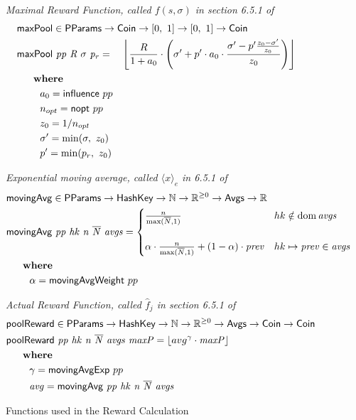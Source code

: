 \begin{figure}[htb]
  \emph{Maximal Reward Function, called $f(s,\sigma)$ in section 6.5.1 of \cite{delegation_design}}
  \begin{align*}
      & \fun{maxPool} \in \PParams \to \Coin \to \unitInterval \to \unitInterval \to \Coin \\
      & \fun{maxPool}~\var{pp}~\var{R}~\sigma~\var{p_r} =
          ~~~\floor*{
             \frac{R}{1 + a_0}
             \cdot
             \left(
               \sigma' + p'\cdot a_0\cdot\frac{\sigma' - p'\frac{z_0-\sigma'}{z_0}}{z_0}
             \right)} \\
      & ~~~\where \\
      & ~~~~~~~a_0 = \fun{influence}~pp \\
      & ~~~~~~~n_{opt} = \fun{nopt}~pp \\
      & ~~~~~~~z_0 = 1/n_{opt} \\
      & ~~~~~~~\sigma'=\min(\sigma,~z_0) \\
      & ~~~~~~~p'=\min(p_r,~z_0) \\
  \end{align*}

  \emph{Exponential moving average, called $\langle x\rangle_e$ in 6.5.1 of
        \cite{delegation_design}}
  \begin{align*}
      & \fun{movingAvg} \in \PParams \to \HashKey \to \N \to \Rnn \to \Avgs \to \R \\
      & \movingAvg{pp}{hk}{n}{\overline{N}}{avgs} =
        \begin{cases}
        \frac{n}{\max(\overline{N}, 1)}
        & hk\notin \dom\var{avgs}\\
        \\
          \alpha\cdot\frac{n}{\max(\overline{N}, 1)}+(1-\alpha)\cdot\var{prev}
        & hk\mapsto\var{prev}\in\var{avgs}\\
        \end{cases} \\
      & ~~~\where \\
      & ~~~~~~~\alpha = \fun{movingAvgWeight}~pp \\
  \end{align*}

  \emph{Actual Reward Function, called $\hat{f}_j$ in section 6.5.1 of \cite{delegation_design}}
  \begin{align*}
      & \fun{poolReward} \in \PParams \to \HashKey \to \N \to \Rnn \to \Avgs \to \Coin \to \Coin \\
      & \poolReward{pp}{hk}{n}{\overline{N}}{avgs}{maxP} =
      \floor*{avg^\gamma\cdot \var{maxP}}\\
      & ~~~\where \\
      & ~~~~~~~\gamma = \fun{movingAvgExp}~pp \\
      & ~~~~~~~\var{avg} = \movingAvg{pp}{hk}{n}{\overline{N}}{avgs} \\
  \end{align*}
  \caption{Functions used in the Reward Calculation}
  \label{fig:functions:rewards}
\end{figure}

